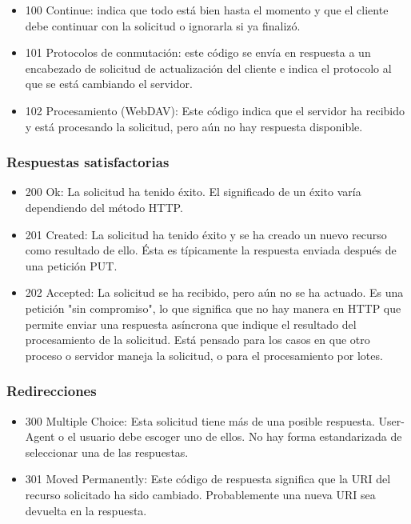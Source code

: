 \begin{itemize}
	\item 100 Continue: indica que todo está bien hasta el momento y que el cliente debe continuar con la solicitud o ignorarla si ya finalizó.
	\item 101 Protocolos de conmutación: este código se envía en respuesta a un encabezado de solicitud de actualización del cliente e indica el protocolo al que se está cambiando el servidor.
	\item 102 Procesamiento (WebDAV): Este código indica que el servidor ha recibido y está procesando la solicitud, pero aún no hay respuesta disponible.
\end{itemize}

\subsubsection{Respuestas satisfactorias}

\begin{itemize}
	\item 200 Ok: La solicitud ha tenido éxito. El significado de un éxito varía dependiendo del método HTTP.
	\item 201 Created: La solicitud ha tenido éxito y se ha creado un nuevo recurso como resultado de ello. Ésta es típicamente la respuesta enviada después de una petición PUT.
	\item 202 Accepted: La solicitud se ha recibido, pero aún no se ha actuado. Es una petición "sin compromiso", lo que significa que no hay manera en HTTP que permite enviar una respuesta asíncrona que indique el resultado del procesamiento de la solicitud. Está pensado para los casos en que otro proceso o servidor maneja la solicitud, o para el procesamiento por lotes.
\end{itemize}

\subsubsection{Redirecciones}

\begin{itemize}
	\item 300 Multiple Choice: Esta solicitud tiene más de una posible respuesta. User-Agent o el usuario debe escoger uno de ellos. No hay forma estandarizada de seleccionar una de las respuestas.
	\item 301 Moved Permanently: Este código de respuesta significa que la URI  del recurso solicitado ha sido cambiado. Probablemente una nueva URI sea devuelta en la respuesta.
\end{itemize}

